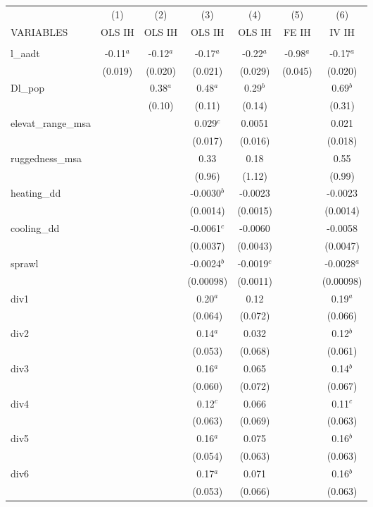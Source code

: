 \documentclass[]{article}
\begin{document}
\begin{tabular}{lcccccc} \hline
 & (1) & (2) & (3) & (4) & (5) & (6) \\
VARIABLES & OLS IH & OLS IH & OLS IH & OLS IH & FE IH & IV IH \\ \hline
 &  &  &  &  &  &  \\
l\_aadt & -0.11$^a$ & -0.12$^a$ & -0.17$^a$ & -0.22$^a$ & -0.98$^a$ & -0.17$^a$ \\
 & (0.019) & (0.020) & (0.021) & (0.029) & (0.045) & (0.020) \\
Dl\_pop &  & 0.38$^a$ & 0.48$^a$ & 0.29$^b$ &  & 0.69$^b$ \\
 &  & (0.10) & (0.11) & (0.14) &  & (0.31) \\
elevat\_range\_msa &  &  & 0.029$^c$ & 0.0051 &  & 0.021 \\
 &  &  & (0.017) & (0.016) &  & (0.018) \\
ruggedness\_msa &  &  & 0.33 & 0.18 &  & 0.55 \\
 &  &  & (0.96) & (1.12) &  & (0.99) \\
heating\_dd &  &  & -0.0030$^b$ & -0.0023 &  & -0.0023 \\
 &  &  & (0.0014) & (0.0015) &  & (0.0014) \\
cooling\_dd &  &  & -0.0061$^c$ & -0.0060 &  & -0.0058 \\
 &  &  & (0.0037) & (0.0043) &  & (0.0047) \\
sprawl &  &  & -0.0024$^b$ & -0.0019$^c$ &  & -0.0028$^a$ \\
 &  &  & (0.00098) & (0.0011) &  & (0.00098) \\
div1 &  &  & 0.20$^a$ & 0.12 &  & 0.19$^a$ \\
 &  &  & (0.064) & (0.072) &  & (0.066) \\
div2 &  &  & 0.14$^a$ & 0.032 &  & 0.12$^b$ \\
 &  &  & (0.053) & (0.068) &  & (0.061) \\
div3 &  &  & 0.16$^a$ & 0.065 &  & 0.14$^b$ \\
 &  &  & (0.060) & (0.072) &  & (0.067) \\
div4 &  &  & 0.12$^c$ & 0.066 &  & 0.11$^c$ \\
 &  &  & (0.063) & (0.069) &  & (0.063) \\
div5 &  &  & 0.16$^a$ & 0.075 &  & 0.16$^b$ \\
 &  &  & (0.054) & (0.063) &  & (0.063) \\
div6 &  &  & 0.17$^a$ & 0.071 &  & 0.16$^b$ \\
 &  &  & (0.053) & (0.066) &  & (0.063) \\

\end{tabular}
\end{document}
